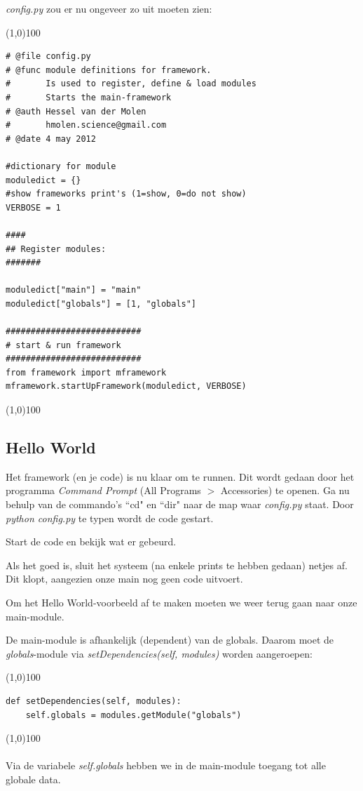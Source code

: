 \documentclass[a4paper, twoside]{article}
\begin{document}
\textit{config.py} zou er nu ongeveer zo uit moeten zien:

\noindent \line(1,0){100}
\begin{verbatim}
# @file config.py
# @func module definitions for framework. 
#       Is used to register, define & load modules 
#       Starts the main-framework
# @auth Hessel van der Molen
#       hmolen.science@gmail.com
# @date 4 may 2012

#dictionary for module
moduledict = {}
#show frameworks print's (1=show, 0=do not show)
VERBOSE = 1

####
## Register modules:
#######

moduledict["main"] = "main"
moduledict["globals"] = [1, "globals"]

###########################
# start & run framework
###########################
from framework import mframework
mframework.startUpFramework(moduledict, VERBOSE)
\end{verbatim}
\noindent \line(1,0){100}

\subsection{Hello World}
Het framework (en je code) is nu klaar om te runnen. Dit wordt gedaan door het programma \textit{Command Prompt} (All Programs $>$ Accessories) te openen. 
Ga nu behulp van de commando's ``cd"  en ``dir" naar de map waar \textit{config.py} staat.
Door \textit{python config.py} te typen wordt de code gestart.

Start de code en bekijk wat er gebeurd.

Als het goed is, sluit het systeem (na enkele prints te hebben gedaan) netjes af. Dit klopt, aangezien onze main nog geen code uitvoert.

Om het Hello World-voorbeeld af te maken moeten we weer terug gaan naar onze main-module.

De main-module is afhankelijk (dependent) van de globals. Daarom moet de \textit{globals}-module via \textit{setDependencies(self, modules)} worden aangeroepen:

\noindent \line(1,0){100}
\begin{verbatim}
def setDependencies(self, modules):
    self.globals = modules.getModule("globals")
\end{verbatim}
\noindent \line(1,0){100}
\\\\
Via de variabele \textit{self.globals} hebben we in de main-module toegang tot alle globale data.
\end{document}
